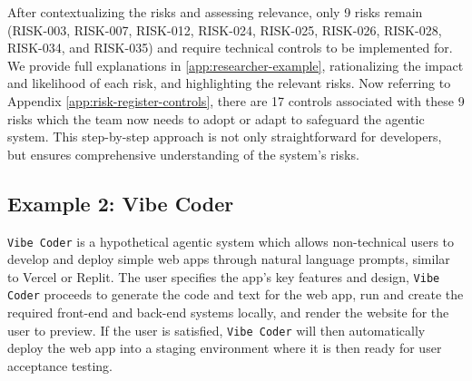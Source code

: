 \documentclass{article}
\begin{document}

After contextualizing the risks and assessing relevance, only 9 risks remain (RISK-003, RISK-007, RISK-012, RISK-024, RISK-025, RISK-026, RISK-028, RISK-034, and RISK-035) and require technical controls to be implemented for. We provide full explanations in \autoref{app:researcher-example}, rationalizing the impact and likelihood of each risk, and highlighting the relevant risks. Now referring to Appendix \ref{app:risk-register-controls}, there are 17 controls associated with these 9 risks which the team now needs to adopt or adapt to safeguard the agentic system. This step-by-step approach is not only straightforward for developers, but ensures comprehensive understanding of the system's risks.

\subsection{Example 2: Vibe Coder}

\texttt{Vibe Coder} is a hypothetical agentic system which allows non-technical users to develop and deploy simple web apps through natural language prompts, similar to Vercel or Replit. The user specifies the app's key features and design, \texttt{Vibe Coder} proceeds to generate the code and text for the web app, run and create the required front-end and back-end systems locally, and render the website for the user to preview. If the user is satisfied, \texttt{Vibe Coder} will then automatically deploy the web app into a staging environment where it is then ready for user acceptance testing.
\end{document}
